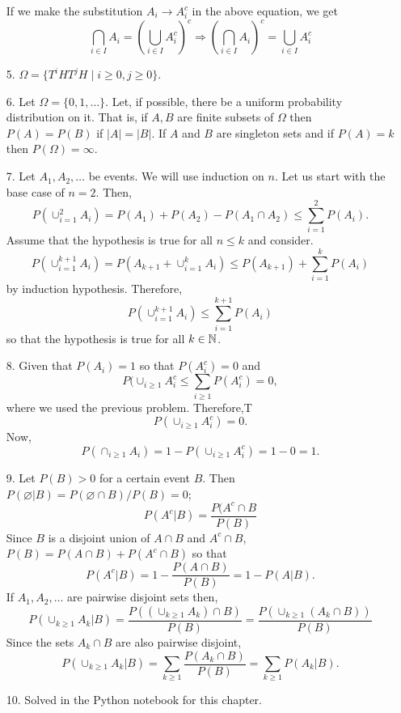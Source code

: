 \documentclass{article}
\begin{document}
\begin{enumerate}
If we make the substitution $A_i \rightarrow A_i^c$ in the above equation, we 
get
\[
\bigcap_{i\in I}A_i = \left(\bigcup_{i \in I}A_i^c\right)^c \Rightarrow
\left(\bigcap_{i \in I}A_i\right)^c = \bigcup_{i \in I}A_i^c
\]

\item[5.] $\Omega = \{T^i H T^j H\;|\; i \ge 0, j \ge 0\}$.

\item[6.] Let $\Omega = \{0, 1, \ldots\}$. Let, if possible, there be a 
uniform probability distribution on it. That is, if $A, B$ are finite subsets of
$\Omega$ then $P(A) = P(B)$ if $|A| = |B|$. If $A$ and $B$ are singleton sets 
and if $P(A) = k$ then $P(\Omega) = \infty$. 

\item[7.] Let $A_1, A_2, \ldots$ be events. We will use induction on $n$.
Let us start with the base case of $n = 2$. Then,
\[
P(\cup_{i=1}^2 A_i) = P(A_1) + P(A_2) - P(A_1 \cap A_2) \le \sum_{i=1}^2 P(A_i).
\]
Assume that the hypothesis is true for all $n \le k$ and consider.
\[
P(\cup_{i=1}^{k+1} A_i) = P(A_{k+1} + \cup_{i=1}^k A_i) \le P(A_{k+1}) + 
\sum_{i=1}^k P(A_i)
\]
by induction hypothesis. Therefore,
\[
P(\cup_{i=1}^{k+1} A_i) \le \sum_{i=1}^{k+1} P(A_i)
\]
so that the hypothesis is true for all $k \in \mathbb{N}$.

\item[8.] Given that $P(A_i) = 1$ so that $P(A_i^c) = 0$ and
\[
P(\cup_{i \ge 1} A_i^c \le \sum_{i \ge 1} P(A_i^c) = 0,
\]
where we used the previous problem. Therefore,T
\[
P(\cup_{i \ge 1} A_i^c) = 0.
\]
Now,
\[
P(\cap_{i \ge 1}A_i) = 1 - P(\cup_{i \ge 1}A_i^c) = 1 - 0 = 1.
\]

\item[9.] Let $P(B) > 0$ for a certain event $B$. Then $P(\varnothing|B)
= P(\varnothing \cap B)/P(B) = 0$; 
\[
P(A^c|B) = \frac{P(A^c \cap B}{P(B)}
\]
Since $B$ is a disjoint union of $A \cap B$ and $A^c \cap B$, $P(B) = P(A \cap B)
+ P(A^c \cap B)$ so that
\[
P(A^c|B) = 1 - \frac{P(A \cap B)}{P(B)} = 1 - P(A|B).
\]
If $A_1, A_2, \ldots$ are pairwise disjoint sets then,
\[
P(\cup_{k \ge 1}A_k | B) = \frac{P((\cup_{k\ge 1} A_k) \cap B)}{P(B)}
= \frac{P(\cup_{k\ge 1} (A_k \cap B))}{P(B)}
\]
Since the sets $A_k \cap B$ are also pairwise disjoint,
\[
P(\cup_{k \ge 1}A_k | B) = \sum_{k \ge 1}\frac{P(A_k \cap B)}{P(B)} = 
\sum_{k \ge 1}P(A_k | B).
\]

\item[10.] Solved in the Python notebook for this chapter.


\end{enumerate}
\end{document}
